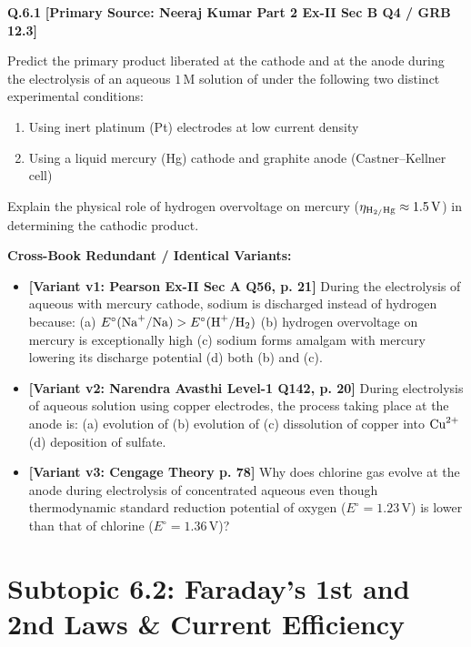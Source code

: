 \begin{problembox}
\textbf{Q.6.1} \hfill \textbf{[Primary Source: Neeraj Kumar Part 2 Ex-II Sec B Q4 / GRB  12.3]}
\label{q:qb-c6-01}

Predict the primary product liberated at the cathode and at the anode during the electrolysis of an aqueous $1\,\text{M}$ solution of  under the following two distinct experimental conditions:
\begin{enumerate}[label=(\alph*)]
    \item Using inert platinum (Pt) electrodes at low current density
    \item Using a liquid mercury (Hg) cathode and graphite anode (Castner--Kellner cell)
\end{enumerate}
Explain the physical role of hydrogen overvoltage on mercury ($\eta_{\ce{H2/Hg}} \approx 1.5\,\text{V}$) in determining the cathodic product.

\tcbline
\textbf{\color{accentamber}Cross-Book Redundant / Identical Variants:}
\begin{itemize}[leftmargin=*,itemsep=2pt]
    \item \textbf{[Variant v1: Pearson Ex-II Sec A Q56, p. 21]} During the electrolysis of aqueous  with mercury cathode, sodium is discharged instead of hydrogen because: (a) $E^\circ(\ce{Na+/Na}) > E^\circ(\ce{H+/H2})$ (b) hydrogen overvoltage on mercury is exceptionally high (c) sodium forms amalgam with mercury lowering its discharge potential (d) both (b) and (c).
    \item \textbf{[Variant v2: Narendra Avasthi Level-1 Q142, p. 20]} During electrolysis of aqueous  solution using copper electrodes, the process taking place at the anode is: (a) evolution of  (b) evolution of  (c) dissolution of copper into $\ce{Cu^2+}$ (d) deposition of sulfate.
    \item \textbf{[Variant v3: Cengage Theory p. 78]} Why does chlorine gas evolve at the anode during electrolysis of concentrated aqueous  even though thermodynamic standard reduction potential of oxygen ($E^\circ = 1.23\,\text{V}$) is lower than that of chlorine ($E^\circ = 1.36\,\text{V}$)?
\end{itemize}
\end{problembox}

\section{Subtopic 6.2: Faraday's 1st and 2nd Laws \& Current Efficiency}

